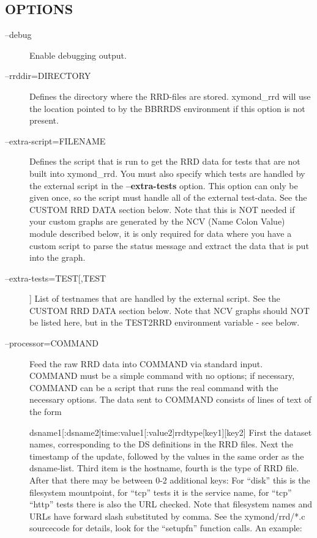  
\subsection{OPTIONS}
\begin{description}
\item[--debug] Enable debugging output. 

 

\item[--rrddir=DIRECTORY] Defines the directory where the RRD-files are stored. xymond\_rrd will use the location pointed to by the BBRRDS environment if this option is not present. 

 

\item[--extra-script=FILENAME] Defines the script that is run to get the RRD data for tests that are not built into xymond\_rrd. You must also specify which tests are handled by the external script in the \textbf{--extra-tests}
 option. This option can only be given once, so the script must handle all of the external test-data. See the CUSTOM RRD DATA section below. Note that this is NOT needed if your custom graphs are generated by the NCV (Name Colon Value) module described below, it is only required for data where you have a custom script to parse the status message and extract the data that is put into the graph. 

 

\item[--extra-tests=TEST[,TEST]] List of testnames that are handled by the external script. See the CUSTOM RRD DATA section below. Note that NCV graphs should NOT be listed here, but in the TEST2RRD environment variable - see below. 

 

\item[--processor=COMMAND] Feed the raw RRD data into COMMAND via standard input. COMMAND must be a simple command with no options; if necessary, COMMAND can be a script that runs the real command with the necessary options. The data sent to COMMAND consists of lines of text of the form  
 
dsname1[:dsname2]time:value1[:value2]rrdtype[key1][key2]  
 First the dataset names, corresponding to the DS definitions in the RRD files. Next the timestamp of the update, followed by the values in the same order as the dsname-list. Third item is the hostname, fourth is the type of RRD file. After that there may be between 0-2 additional keys: For ``disk'' this is the filesystem mountpoint, for ``tcp'' tests it is the service name, for ``tcp'' ``http'' tests there is also the URL checked. Note that filesystem names and URLs have forward slash substituted by comma. See the xymond/rrd/*.c sourcecode for details, look for the ``setupfn'' function calls. An example:  



\end{description}
